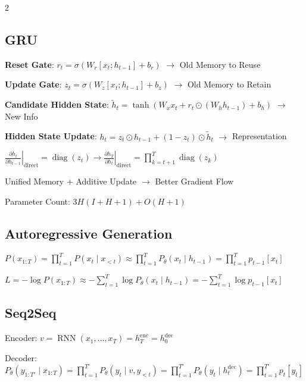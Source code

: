\documentclass[a4paper]{article}
\let\originalsum\sum
\let\originalprod\prod
\renewcommand{\sum}{\mathop{\textstyle\originalsum}\nolimits}
\renewcommand{\prod}{\mathop{\textstyle\originalprod}\nolimits}
\begin{document}
\begin{multicols}{2}
\subsection*{GRU}
\noindent \textbf{Reset Gate}: \(\displaystyle r_t=\sigma(W_r[x_t;h_{t-1}]+b_r)\) \(\to\) Old Memory to Reuse\par
\noindent \textbf{Update Gate}: \(\displaystyle z_t=\sigma(W_z[x_t;h_{t-1}]+b_z)\) \(\to\) Old Memory to Retain\par
\noindent \textbf{Candidate Hidden State}: \(\displaystyle \tilde h_t=\tanh(W_xx_t+r_t\odot(W_hh_{t-1})+b_h)\) \(\to\) New Info\par
\noindent \textbf{Hidden State Update}: \(\displaystyle h_t=z_t\odot h_{t-1}+(1-z_t)\odot\tilde h_t\) \(\to\) Representation\par
\noindent \(\displaystyle \left.\frac{\partial h_t}{\partial h_{t-1}}\right|_{\mathrm{direct}}=\operatorname{diag}(z_t)\to\left.\frac{\partial h_T}{\partial h_t}\right|_{\mathrm{direct}}=\prod_{k=t+1}^{T}\operatorname{diag}(z_k)\)\par
\noindent Unified Memory + Additive Update \(\to\) Better Gradient Flow\par
\noindent Parameter Count: \(\displaystyle 3H(I+H+1) + O(H + 1)\)\par
\subsection*{Autoregressive Generation}
\noindent \(\displaystyle P(x_{1:T})=\prod_{t=1}^{T}P(x_t\mid x_{<t}) \approx \prod_{t=1}^{T}P_\theta(x_t\mid h_{t-1})=\prod_{t=1}^{T}p_{t-1}[x_t]\)\par
\noindent \(\displaystyle L=-\log P(x_{1:T})\approx-\sum_{t=1}^{T}\log P_\theta(x_t\mid h_{t-1})=-\sum_{t=1}^{T}\log p_{t-1}[x_t]\)\par
\subsection*{Seq2Seq}
\noindent Encoder: \(\displaystyle v=\operatorname{RNN}(x_1,\ldots,x_T)=h_T^{\mathrm{enc}}=h_0^{\mathrm{dec}}\)\par
\noindent Decoder: \(\displaystyle P_\theta(y_{1:T'}\mid x_{1:T})=\prod_{t=1}^{T'}P_\theta(y_t\mid v,y_{<t})=\prod_{t=1}^{T'}P_\theta(y_t\mid h_t^{\mathrm{dec}})=\prod_{t=1}^{T'}p_t[y_t]\)\par

\end{multicols}
\end{document}
